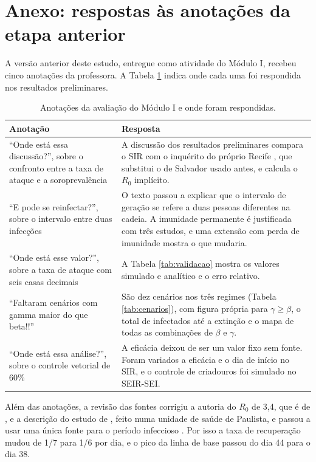 \section{Anexo: respostas às anotações da etapa anterior}
\label{sec:anotacoes}

A versão anterior deste estudo, entregue como atividade do Módulo I, recebeu cinco anotações da
professora. A Tabela \ref{tab:anotacoes} indica onde cada uma foi respondida nos resultados preliminares.

\begin{table}[htb]
\centering
\caption{Anotações da avaliação do Módulo I e onde foram respondidas.}
\label{tab:anotacoes}
\small
\begin{tabular}{p{5.2cm}p{9.6cm}}
\toprule
\textbf{Anotação} & \textbf{Resposta} \\
\midrule
``Onde está essa discussão?'', sobre o confronto entre a taxa de ataque e a soroprevalência &
A discussão dos resultados preliminares compara o SIR com o inquérito do próprio Recife
\cite{braga2023}, que substitui o de Salvador usado antes, e calcula o $R_0$ implícito. \\
\addlinespace
``E pode se reinfectar?'', sobre o intervalo entre duas infecções &
O texto passou a explicar que o intervalo de geração se refere a duas pessoas diferentes na cadeia. A
imunidade permanente é justificada com três estudos, e uma extensão com perda de imunidade mostra o que
mudaria. \\
\addlinespace
``Onde está esse valor?'', sobre a taxa de ataque com seis casas decimais &
A Tabela \ref{tab:validacao} mostra os valores simulado e analítico e o erro relativo. \\
\addlinespace
``Faltaram cenários com gamma maior do que beta!!'' &
São dez cenários nos três regimes (Tabela \ref{tab:cenarios}), com figura própria para $\gamma \geq \beta$,
o total de infectados até a extinção e o mapa de todas as combinações de $\beta$ e $\gamma$. \\
\addlinespace
``Onde está essa análise?'', sobre o controle vetorial de 60\% &
A eficácia deixou de ser um valor fixo sem fonte. Foram variados a eficácia e o dia de início no SIR, e o
controle de criadouros foi simulado no SEIR-SEI. \\
\bottomrule
\end{tabular}
\end{table}

Além das anotações, a revisão das fontes corrigiu a autoria do $R_0$ de 3,4, que é de
, e a descrição do estudo de , feito numa unidade de saúde
de Paulista, e passou a usar uma única fonte para o período infeccioso \cite{manore2014}. Por isso a taxa
de recuperação mudou de 1/7 para 1/6 por dia, e o pico da linha de base passou do dia 44 para o dia 38.

